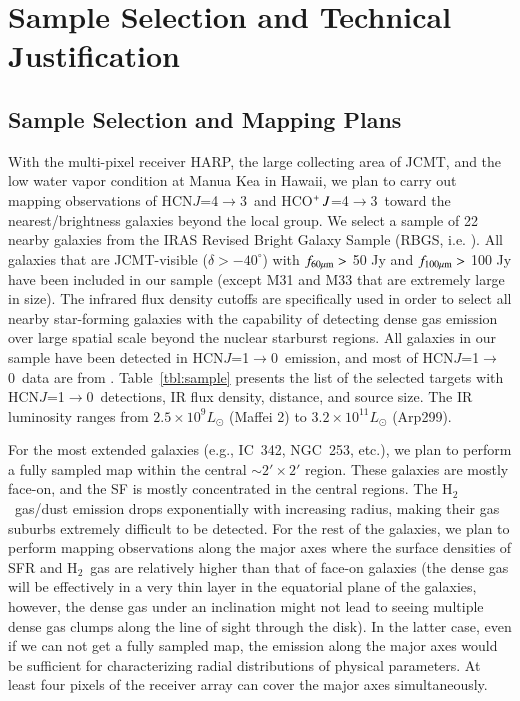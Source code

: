 \documentclass[legal,11pt]{article}
\def\,{\thinspace}
\def\Htwo{H$_2$}
\def\Htwo       {H$_2$}
\def\HCNoz      {HCN\,$J$=1$\rightarrow$0}
\def\HCNft        {HCN\,$J$=4$\rightarrow$3}
\def\HCOPft     {HCO$^+\,J$=4$\rightarrow$3}
\begin{document}
\section{Sample Selection and Technical Justification}
\subsection{Sample Selection and Mapping Plans} 


With the multi-pixel receiver HARP, the large collecting area of JCMT, and the
low water vapor condition at Manua Kea in Hawaii, we plan to carry out mapping
observations of \HCNft\ and \HCOPft\ toward the nearest/brightness galaxies
beyond the local group. We select a sample of 22 nearby galaxies from the IRAS
Revised Bright Galaxy Sample (RBGS, i.e. \citealt{smk03}). All galaxies that
are JCMT-visible ($\delta > -40^\circ$) with $f_{\rm 60\mu m}>$ 50 Jy and
$f_{\rm 100\mu m}>$ 100 Jy have been included in our sample (except M31 and M33
that are extremely large in size). The infrared flux density cutoffs are
specifically used in order to select all nearby star-forming galaxies with the
capability of detecting dense gas emission over large spatial scale beyond the
nuclear starburst regions.  All galaxies in our sample have been detected in
\HCNoz\  emission, and most of \HCNoz\ data are from \citet{gs04a}.
Table~\ref{tbl:sample} presents the list of the selected targets with \HCNoz\
detections, IR flux density, distance, and source size.  The IR luminosity
ranges from $2.5 \times 10^{9} L_{\odot}$ (Maffei 2) to $3.2 \times 10^{11}
L_{\odot}$ (Arp299).  

For the most extended galaxies (e.g., IC~342, NGC~253, etc.),  we plan to
perform a fully sampled map within the central $\sim 2'\times 2 '$ region.
These galaxies are mostly face-on, and the SF is mostly concentrated in the
central regions. The \Htwo\ gas/dust emission drops exponentially with
increasing radius\citep{Leroy2009}, making their gas suburbs extremely
difficult to be detected. For the rest  of the galaxies, we plan to perform mapping
observations along the major axes where the surface densities of SFR and \Htwo\
gas are relatively higher than that of face-on galaxies (the dense gas will be 
effectively in a very thin layer in the equatorial plane of the galaxies, however, 
the dense gas under an inclination might not lead to seeing multiple dense gas 
clumps along the line of sight through the disk). In the latter case,
even if we can not get a fully sampled map, the emission along the major axes
would be sufficient for characterizing radial distributions of physical
parameters. At least four pixels of the receiver array can cover the major axes
simultaneously. 
\end{document}
